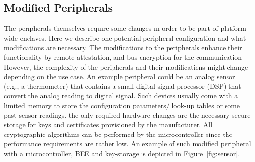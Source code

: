  \subsection{Modified Peripherals}


 The peripherals themselves require some changes in order to be part of platform-wide enclaves. Here we describe one potential peripheral configuration and what modifications are necessary. The modifications to the peripherals enhance their functionality by remote attestation, and bus encryption for the communication However, the complexity of the peripherals and their modifications might change depending on the use case. An example peripheral could be an analog sensor (e.g., a thermometer) that contains a small digital signal processor (DSP) that convert the analog reading to digital signal.  Such devices usually come with a limited memory to store the configuration parameters/ look-up tables or some past sensor readings. the only required hardware changes are the necessary secure storage for keys and certificates provisioned by the manufacturer. All cryptographic algorithms can be performed by the microcontroller since the performance requirements are rather low. An example of such modified peripheral with a microcontroller, BEE and key-storage is depicted in Figure~\ref{fig:sensor}. 